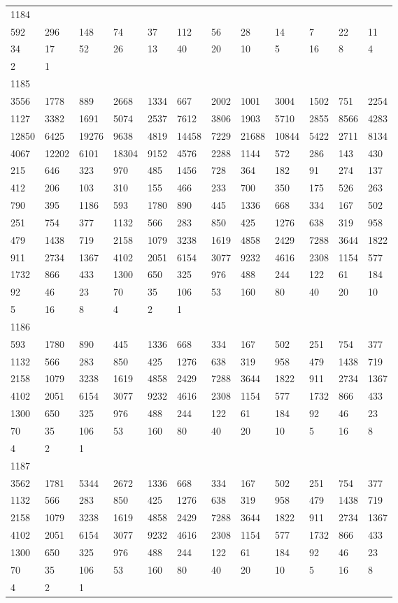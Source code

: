\begin{longtable}{llllllllllll}
1184&&&&&&&&&&&\\
592& 296& 148& 74& 37& 112& 56& 28& 14& 7& 22& 11\\
34& 17& 52& 26& 13& 40& 20& 10& 5& 16& 8& 4\\
2& 1& \\

1185&&&&&&&&&&&\\
3556& 1778& 889& 2668& 1334& 667& 2002& 1001& 3004& 1502& 751& 2254\\
1127& 3382& 1691& 5074& 2537& 7612& 3806& 1903& 5710& 2855& 8566& 4283\\
12850& 6425& 19276& 9638& 4819& 14458& 7229& 21688& 10844& 5422& 2711& 8134\\
4067& 12202& 6101& 18304& 9152& 4576& 2288& 1144& 572& 286& 143& 430\\
215& 646& 323& 970& 485& 1456& 728& 364& 182& 91& 274& 137\\
412& 206& 103& 310& 155& 466& 233& 700& 350& 175& 526& 263\\
790& 395& 1186& 593& 1780& 890& 445& 1336& 668& 334& 167& 502\\
251& 754& 377& 1132& 566& 283& 850& 425& 1276& 638& 319& 958\\
479& 1438& 719& 2158& 1079& 3238& 1619& 4858& 2429& 7288& 3644& 1822\\
911& 2734& 1367& 4102& 2051& 6154& 3077& 9232& 4616& 2308& 1154& 577\\
1732& 866& 433& 1300& 650& 325& 976& 488& 244& 122& 61& 184\\
92& 46& 23& 70& 35& 106& 53& 160& 80& 40& 20& 10\\
5& 16& 8& 4& 2& 1& \\

1186&&&&&&&&&&&\\
593& 1780& 890& 445& 1336& 668& 334& 167& 502& 251& 754& 377\\
1132& 566& 283& 850& 425& 1276& 638& 319& 958& 479& 1438& 719\\
2158& 1079& 3238& 1619& 4858& 2429& 7288& 3644& 1822& 911& 2734& 1367\\
4102& 2051& 6154& 3077& 9232& 4616& 2308& 1154& 577& 1732& 866& 433\\
1300& 650& 325& 976& 488& 244& 122& 61& 184& 92& 46& 23\\
70& 35& 106& 53& 160& 80& 40& 20& 10& 5& 16& 8\\
4& 2& 1& \\

1187&&&&&&&&&&&\\
3562& 1781& 5344& 2672& 1336& 668& 334& 167& 502& 251& 754& 377\\
1132& 566& 283& 850& 425& 1276& 638& 319& 958& 479& 1438& 719\\
2158& 1079& 3238& 1619& 4858& 2429& 7288& 3644& 1822& 911& 2734& 1367\\
4102& 2051& 6154& 3077& 9232& 4616& 2308& 1154& 577& 1732& 866& 433\\
1300& 650& 325& 976& 488& 244& 122& 61& 184& 92& 46& 23\\
70& 35& 106& 53& 160& 80& 40& 20& 10& 5& 16& 8\\
4& 2& 1& \\


\end{longtable}
